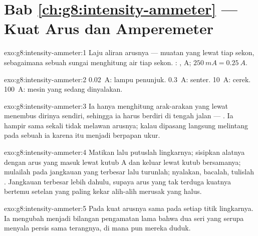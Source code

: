 \section*{Bab \ref{ch:g8:intensity-ammeter} --- Kuat Arus dan Amperemeter}

\begin{solution}{exo:g8:intensity-ammeter:1}
Laju aliran arusnya --- muatan yang lewat tiap sekon, sebagaimana
sebuah sungai menghitung air tiap sekon. : , \unit{A};
$\qty{250}{mA} = \qty{0.25}{A}$.
\end{solution}

\begin{solution}{exo:g8:intensity-ammeter:2}
\qty{0.02}{A}: lampu penunjuk. \qty{0.3}{A}:  senter.
\qty{10}{A}: cerek. \qty{100}{A}: mesin yang sedang dinyalakan.
\end{solution}

\begin{solution}{exo:g8:intensity-ammeter:3}
Ia hanya menghitung arak-arakan yang lewat menembus dirinya sendiri,
sehingga ia harus berdiri di tengah jalan --- . Ia
hampir sama sekali tidak melawan arusnya; kalau dipasang langsung
melintang pada sebuah  ia karena itu menjadi 
berpapan ukur.
\end{solution}

\begin{solution}{exo:g8:intensity-ammeter:4}
Matikan lalu putuslah lingkarnya; sisipkan alatnya dengan arus yang
masuk lewat kutub \unit{A} dan keluar lewat kutub bersamanya; mulailah
pada jangkauan yang terbesar lalu turunlah; nyalakan, bacalah, tulislah
. Jangkauan terbesar lebih dahulu, supaya arus yang tak
terduga kuatnya bertemu setelan yang paling kekar alih-alih merusak
yang halus.
\end{solution}

\begin{solution}{exo:g8:intensity-ammeter:5}
Pada  kuat arusnya sama pada setiap titik lingkarnya. Ia
mengubah menjadi bilangan pengamatan lama bahwa dua  seri yang
serupa menyala persis sama terangnya, di mana pun mereka duduk.
\end{solution}

